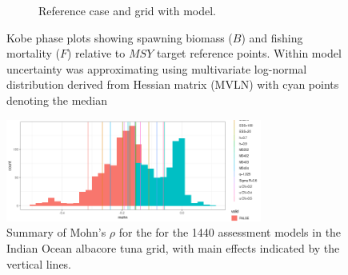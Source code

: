 \begin{figure}
\begin{subfigure}[b]{0.5\textwidth}
                \caption{Reference case and grid with model.}
                \label{fig:kobe-bg}
        \end{subfigure}%
        \caption{Kobe phase plots showing spawning biomass ($B$) and fishing mortality ($F$) relative to $MSY$ target reference points. Within model uncertainty was approximating using multivariate log-normal distribution derived from Hessian matrix (MVLN) with cyan points denoting the median}\label{fig:kobe}
\end{figure}




\clearpage
\newpage
\begin{figure}[ht!]\centering\includegraphics[width=0.75\textwidth]{figures/mohn3-1.png}  \caption{Summary of Mohn's $\rho$ for the for the 1440 assessment models in the Indian Ocean albacore tuna grid, with main effects indicated by the vertical lines.} 
\label{fig:mohn}       
\end{figure}




